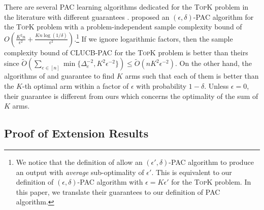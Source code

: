 \documentclass{article}
\newcommand{\AlgorithmPAC}{{\small \textsf{CLUCB-PAC}}\xspace}
\newcommand{\MultiIdent}{\textsc{TopK}\xspace}
\begin{document}
There are several PAC learning algorithms dedicated for the \MultiIdent problem in the literature with different guarantees \citep{kalyanakrishnan2012pac,zhou2014optimal,gabillon2012best}.
\citet{zhou2014optimal} proposed an $(\epsilon,\delta)$-PAC algorithm for the \MultiIdent problem with a problem-independent sample complexity bound of $O(\frac{K^2n}{\epsilon^2}+\frac{Kn\log(1/\delta)}{\epsilon^2})$.\footnote{We notice that the definition of \citet{zhou2014optimal} allow an $(\epsilon',\delta)$-PAC algorithm to produce an output with \emph{average} sub-optimality of $\epsilon'$. This is equivalent to our definition of $(\epsilon,\delta)$-PAC algorithm with $\epsilon=K\epsilon'$ for the \MultiIdent problem.
In this paper, we translate their guarantees to our definition of PAC algorithm.}
If we ignore logarithmic factors, then the sample complexity bound of \AlgorithmPAC for the \MultiIdent problem is better than theirs since $\tilde O(\sum_{e\in[n]}\min\{\Delta_e^{-2}, K^2\epsilon^{-2}\}) \le  \tilde O(nK^2\epsilon^{-2})$.
On the other hand, the algorithms of \citet{kalyanakrishnan2012pac} and \citet{gabillon2012best} guarantee to find $K$ arms such that each of them is better than the $K$-th optimal arm within a factor of $\epsilon$ with probability $1-\delta$.
Unless $\epsilon=0$, their guarantee is different from ours which concerns the optimality of the sum of $K$ arms.





\subsection{Proof of Extension Results}
\end{document}
